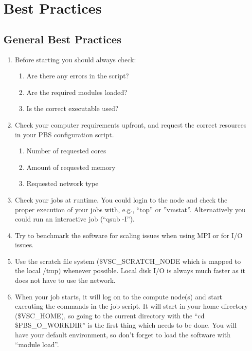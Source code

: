 \chapter{Best Practices}
\label{ch:best-practices}

\section{General Best Practices}
\label{sec:general-best-practices}
\begin{enumerate}

  \item  Before starting you should always check:
  \begin{enumerate}
    \item  Are there any errors in the script?
    \item  Are the required modules loaded?
    \item  Is the correct executable used?
  \end{enumerate}

  \item  Check your computer requirements upfront, and request the correct resources in your PBS configuration script.
  \begin{enumerate}
    \item  Number of requested cores
    \item  Amount of requested memory
    \item  Requested network type
  \end{enumerate}

  \item  Check your jobs at runtime. You could login to the node and check the
    proper execution of your jobs with, e.g., ``top'' or ''vmstat''.
    Alternatively you could run an interactive job (``qsub -I'').

  \item  Try to benchmark the software for scaling issues when using MPI or for
    I/O issues.

  \item  Use the scratch file system (\$VSC\_SCRATCH\_NODE which is mapped to the
    local /tmp) whenever possible. Local disk I/O is always much faster as it
    does not have to use the network.

  \item  When your job starts, it will log on to the compute node(s) and start
    executing the commands in the job script. It will start in your home
    directory (\$VSC\_HOME), so going to the current directory with the ``cd
    \$PBS\_O\_WORKDIR'' is the first thing which needs to be done.  You will
    have your default environment, so don't forget to load the software with
    ``module load''.


\end{enumerate}
